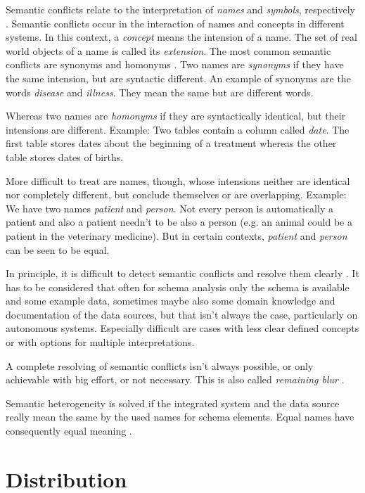 Semantic conflicts relate to the interpretation of \emph{names} and \emph{symbols}, respectively \cite[p. 74]{DBLP:books/dp/LeserN2006}. 
Semantic conflicts occur in the interaction of names and concepts in different systems. 
In this context, a \textit{concept} means the intension of a name. The set of real world objects of a name is called its \emph{extension}. 
The most common semantic conflicts are synonyms and homonyms \cite[p. 75]{DBLP:books/dp/LeserN2006}. 
Two names are \textit{synonyms} if they have the same intension, but are syntactic different. An example of synonyms are the words \emph{disease} and \emph{illness}. They mean the same but are different words.

Whereas two names are \textit{homonyms} if they are syntactically identical, but their intensions are different. Example: Two tables contain a column called \emph{date}. The first table stores dates about the beginning of a treatment whereas the other table stores dates of births.

More difficult to treat are names, though, whose intensions neither are identical nor completely different, but conclude themselves or are overlapping.
Example: We have two names \emph{patient} and \emph{person}. Not every person is automatically a patient and also a patient needn't to be also a person (e.g. an animal could be a patient in the veterinary medicine). But in certain contexts, \emph{patient} and \emph{person} can be seen to be equal.

In principle, it is difficult to detect semantic conflicts and resolve them clearly \cite[p. 76]{DBLP:books/dp/LeserN2006}. 
It has to be considered that often for schema analysis  only the schema is available and some example data, sometimes maybe also some domain knowledge and documentation of the data sources, but that isn’t always the case, particularly on autonomous systems. Especially difficult are cases with less clear defined concepts or with options for multiple interpretations.

A complete resolving of semantic conflicts isn't always possible, or only achievable with big effort, or not necessary. This is also called \textit{remaining blur} \cite[p. 76]{DBLP:books/dp/LeserN2006}.

Semantic heterogeneity is solved if the integrated system and the data source really mean the same by the used names for schema elements. Equal names have consequently equal meaning \cite[p. 61]{DBLP:books/dp/LeserN2006}.

\section{Distribution}

